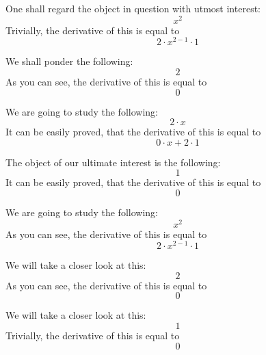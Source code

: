 \documentclass{article}
\begin{document}
One shall regard the object in question with utmost interest:
\begin{equation}
x ^{2 } 
\end{equation}
Trivially, the derivative of this is equal to
\begin{equation}
2 \cdot x ^{2 - 1 } \cdot 1 
\end{equation}

We shall ponder the following:
\begin{equation}
2 
\end{equation}
As you can see, the derivative of this is equal to
\begin{equation}
0 
\end{equation}

We are going to study the following:
\begin{equation}
2 \cdot x 
\end{equation}
It can be easily proved, that the derivative of this is equal to
\begin{equation}
0 \cdot x + 2 \cdot 1 
\end{equation}

The object of our ultimate interest is the following:
\begin{equation}
1 
\end{equation}
It can be easily proved, that the derivative of this is equal to
\begin{equation}
0 
\end{equation}

We are going to study the following:
\begin{equation}
x ^{2 } 
\end{equation}
As you can see, the derivative of this is equal to
\begin{equation}
2 \cdot x ^{2 - 1 } \cdot 1 
\end{equation}

We will take a closer look at this:
\begin{equation}
2 
\end{equation}
As you can see, the derivative of this is equal to
\begin{equation}
0 
\end{equation}

We will take a closer look at this:
\begin{equation}
1 
\end{equation}
Trivially, the derivative of this is equal to
\begin{equation}
0 
\end{equation}
\end{document}
